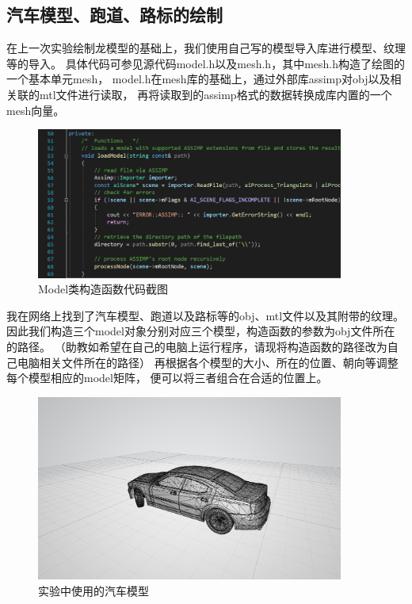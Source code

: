 \documentclass[UTF8]{ctexart}
\begin{document}
\subsection{汽车模型、跑道、路标的绘制}
\par
在上一次实验绘制龙模型的基础上，我们使用自己写的模型导入库进行模型、纹理等的导入。
具体代码可参见源代码model.h以及mesh.h，其中mesh.h构造了绘图的一个基本单元mesh，
model.h在mesh库的基础上，通过外部库assimp对obj以及相关联的mtl文件进行读取，
再将读取到的assimp格式的数据转换成库内置的一个mesh向量。

\begin{figure}[h]
	\centering
	\includegraphics*[width=0.9\textwidth]{1.png}
	\caption{Model类构造函数代码截图}
	\label{fig:1}
\end{figure}

\par
我在网络上找到了汽车模型、跑道以及路标等的obj、mtl文件以及其附带的纹理。
因此我们构造三个model对象分别对应三个模型，构造函数的参数为obj文件所在的路径。
（助教如希望在自己的电脑上运行程序，请现将构造函数的路径改为自己电脑相关文件所在的路径）
再根据各个模型的大小、所在的位置、朝向等调整每个模型相应的model矩阵，
便可以将三者组合在合适的位置上。

\begin{figure}[h]
	\centering
	\includegraphics*[width=0.9\textwidth]{2.png}
	\caption{实验中使用的汽车模型}
	\label{fig:2}
\end{figure}
\end{document}
